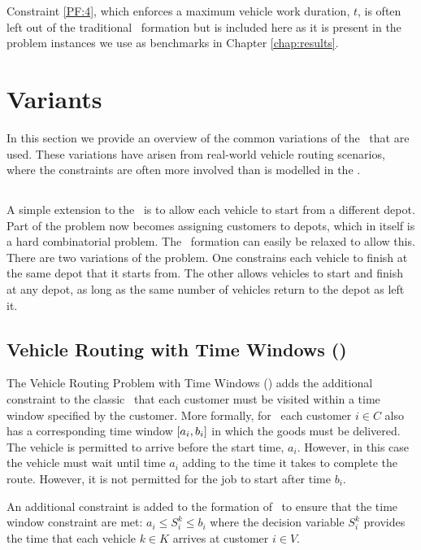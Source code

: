 Constraint \eqref{PF:4}, which enforces a maximum vehicle work duration, $t$, is often left out of the traditional \CVRP\ formation but is included here as it is present in the problem instances we use as benchmarks in Chapter \ref{chap:results}.

\section{Variants}
\label{sec:variants}

In this section we provide an overview of the common variations of the \VRP\ that are used. These variations have arisen from real-world vehicle routing scenarios, where the constraints are often more involved than is modelled in the \CVRP. 

\subsection{\MDVRP}

A simple extension to the \CVRP\ is to allow each vehicle to start from a different depot. Part of the problem now becomes assigning customers to depots, which in itself is a hard combinatorial problem. The \CVRP\ formation can easily be relaxed to allow this. There are two variations of the problem. One constrains each vehicle to finish at the same depot that it starts from. The other allows vehicles to start and finish at any depot, as long as the same number of vehicles return to the depot as left it.

\subsection{Vehicle Routing with Time Windows (\VRPTW)}

The Vehicle Routing Problem with Time Windows (\VRPTW) adds the additional constraint to the classic \VRP\ that each customer must be visited within a time window specified by the customer. More formally, for \VRPTW\ each customer $i \in C$ also has a corresponding time window $[a_i, b_i]$ in which the goods must be delivered. The vehicle is permitted to arrive before the start time, $a_i$. However, in this case the vehicle must wait until time $a_i$ adding to the time it takes to complete the route. However, it is not permitted for the job to start after time $b_i$.

An additional constraint is added to the formation of \CVRP\ to ensure that the time window constraint are met: $a_i \leq S_i^k \leq b_i$ where the decision variable $S_i^k$ provides the time that each vehicle $k \in K$ arrives at customer $i \in V$.

